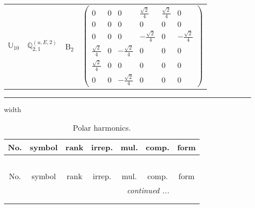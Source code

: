 \documentclass[fleqn,10pt,landscape]{article}
\begin{document}
\begin{itemize}
\begin{center}
\begin{longtable}{c|c|c|c}
$ \mathbb{U}_{10} $ & $\mathbb{Q}_{2,1}^{(u,E,2)}$ & B$_{2}$ & $\begin{pmatrix} 0 & 0 & 0 & \frac{\sqrt{2}}{4} & \frac{\sqrt{2}}{4} & 0 \\ 0 & 0 & 0 & 0 & 0 & 0 \\ 0 & 0 & 0 & - \frac{\sqrt{2}}{4} & 0 & - \frac{\sqrt{2}}{4} \\ \frac{\sqrt{2}}{4} & 0 & - \frac{\sqrt{2}}{4} & 0 & 0 & 0 \\ \frac{\sqrt{2}}{4} & 0 & 0 & 0 & 0 & 0 \\ 0 & 0 & - \frac{\sqrt{2}}{4} & 0 & 0 & 0 \end{pmatrix}$ \\
\end{longtable}
\end{center}

 \hfil \hrule height 1mm width \textwidth \hfil

\begin{center}
\renewcommand{\arraystretch}{1.3}
\begin{longtable}{ccccccc}
\caption{Polar harmonics.}
 \\
 \hline \hline
No. & symbol & rank & irrep. & mul. & comp. & form \\ \hline \endfirsthead

\multicolumn{6}{l}{\tablename\ \thetable{}} \\
 \hline \hline
No. & symbol & rank & irrep. & mul. & comp. & form \\ \hline \endhead

 \hline \hline
\multicolumn{6}{r}{\footnotesize\it continued ...} \\ \endfoot

 \hline \hline
\multicolumn{6}{r}{} \\ \endlastfoot


\end{longtable}
\end{center}
\end{itemize}
\end{document}
